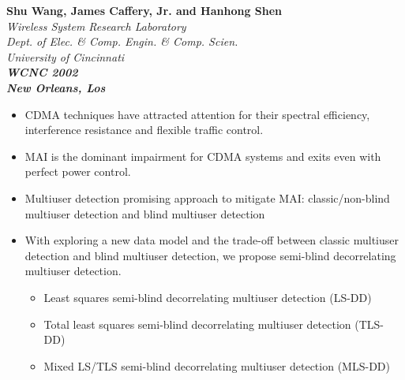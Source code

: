 \documentclass[20pt,landscape]{foils}
\begin{document}
\raggedright \color{black}
\pagecolor{bgcolor} %



\begin{center}
\vspace{.3in}
{\bf Shu Wang, James Caffery, Jr. and Hanhong Shen}  \\
{\it \vspace{0.9in} Wireless System Research Laboratory \\
\vspace{0.2in} Dept. of Elec. \& Comp. Engin. \& Comp. Scien.
\\ University of Cincinnati\\
{\bf WCNC 2002 \\ New Orleans, Los}}
\end{center}

\begin{itemize}
\item CDMA techniques have attracted attention for their spectral
efficiency, interference resistance and flexible traffic control.
\item MAI is the dominant impairment for CDMA systems and exits
even with perfect power control.
\item Multiuser detection promising approach to mitigate MAI:
classic/non-blind multiuser detection and blind multiuser
detection

\item With exploring a new data model and the trade-off between
classic multiuser detection and blind multiuser detection, we
propose semi-blind decorrelating multiuser detection.
 \begin{itemize}
 \item Least squares semi-blind decorrelating multiuser detection (LS-DD)
 \item Total least squares semi-blind decorrelating multiuser detection (TLS-DD)
 \item Mixed LS/TLS  semi-blind decorrelating multiuser detection (MLS-DD)
 \end{itemize}
\end{itemize}
\end{document}
